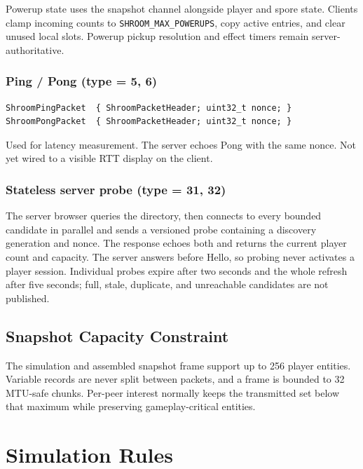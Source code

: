 \documentclass[11pt]{article}
\begin{document}
Powerup state uses the snapshot channel alongside player and spore state. Clients clamp incoming counts to \texttt{SHROOM\_MAX\_POWERUPS}, copy active entries, and clear unused local slots. Powerup pickup resolution and effect timers remain server-authoritative.

\subsubsection{Ping / Pong (type = 5, 6)}

\begin{verbatim}
ShroomPingPacket  { ShroomPacketHeader; uint32_t nonce; }
ShroomPongPacket  { ShroomPacketHeader; uint32_t nonce; }
\end{verbatim}

Used for latency measurement. The server echoes Pong with the same nonce. Not yet wired to a visible RTT display on the client.

\subsubsection{Stateless server probe (type = 31, 32)}

The server browser queries the directory, then connects to every bounded candidate in parallel and
sends a versioned probe containing a discovery generation and nonce. The response echoes both and
returns the current player count and capacity. The server answers before Hello, so probing never
activates a player session. Individual probes expire after two seconds and the whole refresh after
five seconds; full, stale, duplicate, and unreachable candidates are not published.

\subsection{Snapshot Capacity Constraint}

The simulation and assembled snapshot frame support up to 256 player entities. Variable records are never split between packets, and a frame is bounded to 32 MTU-safe chunks. Per-peer interest normally keeps the transmitted set below that maximum while preserving gameplay-critical entities.

\section{Simulation Rules}
\end{document}

